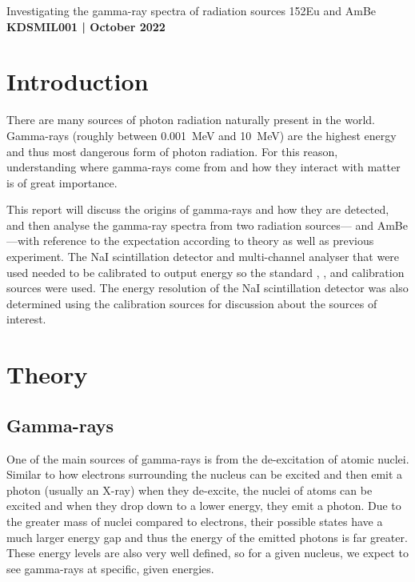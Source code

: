 \documentclass[11pt]{article}
\numberwithin{equation}{section}
\numberwithin{figure}{section}
\numberwithin{table}{section}
\begin{document}
\begin{center}
    {\huge Investigating the gamma-ray spectra of radiation sources 152Eu and AmBe}\\
    \vspace{0.2in}
    \textbf{KDSMIL001 | October 2022}
\end{center}


\section{Introduction}\label{sec:Introduction}
There are many sources of photon radiation naturally present in the world. Gamma-rays (roughly between \SI{0.001}{\mega\electronvolt} and \SI{10}{\mega\electronvolt}) are the highest energy and thus most dangerous form of photon radiation. For this reason, understanding where gamma-rays come from and how they interact with matter is of great importance. 

This report will discuss the origins of gamma-rays and how they are detected, and then analyse the gamma-ray spectra from two radiation sources--- and AmBe---with reference to the expectation according to theory as well as previous experiment. The NaI scintillation detector and multi-channel analyser that were used needed to be calibrated to output energy so the standard , , and  calibration sources were used. The energy resolution of the NaI scintillation detector was also determined using the calibration sources for discussion about the sources of interest.

\section{Theory}\label{sec:Theory}

\subsection{Gamma-rays}\label{sec:GammaTheory}
One of the main sources of gamma-rays is from the de-excitation of atomic nuclei. Similar to how electrons surrounding the nucleus can be excited and then emit a photon (usually an X-ray) when they de-excite, the nuclei of atoms can be excited and when they drop down to a lower energy, they emit a photon. Due to the greater mass of nuclei compared to electrons, their possible states have a much larger energy gap and thus the energy of the emitted photons is far greater. These energy levels are also very well defined, so for a given nucleus, we expect to see gamma-rays at specific, given energies. 
\end{document}
